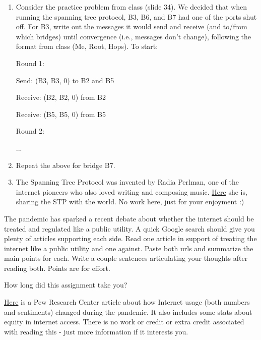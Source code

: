 \documentclass[10pt]{article}
\newenvironment{problem}[2][Problem]{\begin{trivlist}
\item[\hskip \labelsep {\bfseries #1}\hskip \labelsep {\bfseries #2.}]}{\end{trivlist}}
\begin{document}
\begin{problem} {2: Spanning Tree}
\begin{enumerate}
    \item Consider the practice problem from class (slide 34). We decided that when running the spanning tree protocol, B3, B6, and B7 had one of the ports shut off. For B3, write out the messages it would send and receive (and to/from which bridges) until convergence (i.e., messages don't change), following the format from class (Me, Root, Hops). To start: 
    
    Round 1:
    
    Send: (B3, B3, 0) to B2 and B5
    
    Receive: (B2, B2, 0) from B2
    
    Receive: (B5, B5, 0) from B5
    
    Round 2:
    
    ...
    
    
   \item Repeat the above for bridge B7.
   \item The Spanning Tree Protocol was invented by Radia Perlman, one of the internet pioneers who also loved writing and composing music. \href{https://www.youtube.com/watch?v=iE_AbM8ZykI}{Here} she is, sharing the STP with the world. No work here, just for your enjoyment :)
    
\end{enumerate}
\end{problem}
\begin{problem}{3: Reading}
The pandemic has sparked a recent debate about whether the internet should be treated and regulated like a public utility. A quick Google search should give you plenty of articles supporting each side. Read one article in support of treating the internet like a public utility and one against. Paste both urls and summarize the main points for each. Write a couple sentences articulating your thoughts after reading both. Points are for effort.
\end{problem}
\begin{problem}{4}
How long did this assignment take you?
\end{problem}
\begin{problem}{5: Extra (optional) reading}
\href{https://www.pewresearch.org/internet/2021/09/01/the-internet-and-the-pandemic/}{Here} is a Pew Research Center article about how Internet usage (both numbers and sentiments) changed during the pandemic. It also includes some stats about equity in internet access. There is no work or credit or extra credit associated with reading this - just more information if it interests you. 
\end{problem}
\end{document}
